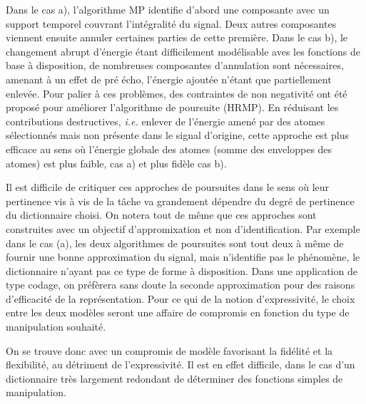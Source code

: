 Dans le cas a), l'algorithme MP identifie d'abord une composante avec un support temporel couvrant l'intégralité du signal. Deux autres composantes viennent ensuite annuler certaines parties de cette première. Dans le cas b), le changement abrupt d'énergie étant difficilement modélisable aves les fonctions de base à disposition, de nombreuses composantes d'annulation sont nécessaires, amenant à un effet de pré écho, l'énergie ajoutée n'étant que partiellement enlevée. Pour palier à ces problèmes, des contraintes de non negativité ont été proposé pour améliorer l'algorithme de poursuite (HRMP). En réduisant les contributions destructives, \textit{i.e.} enlever de l'énergie amené par des atomes sélectionnés mais non présente dans le signal d'origine, cette approche est plus efficace au sens où l'énergie globale des atomes (somme des enveloppes des atomes) est plus faible, cas a) et plus fidèle cas b).

Il est difficile de critiquer ces approches de poursuites dans le sens où leur pertinence vis à vis de la tâche va grandement dépendre du degré de pertinence du dictionnaire choisi. On notera tout de même que ces approches sont construites avec un objectif d'appromixation et non d'identification. Par exemple dans le cas (a), les deux algorithmes de poursuites sont tout deux à même de fournir une bonne approximation du signal, mais \og n'identifie \fg pas le phénomène, le dictionnaire n'ayant pas ce type de forme à disposition. Dans une application de type codage, on préfèrera sans doute la seconde approximation pour des raisons d'efficacité de la représentation. Pour ce qui de la notion d'expressivité, le choix entre les deux modèles seront une affaire de compromis en fonction du type de manipulation souhaité.

On se trouve donc avec un compromis de modèle favorisant la fidélité et la flexibilité, au détriment de l'expressivité. Il est en effet difficile, dans le cas d'un dictionnaire très largement redondant de déterminer des fonctions simples de manipulation.


